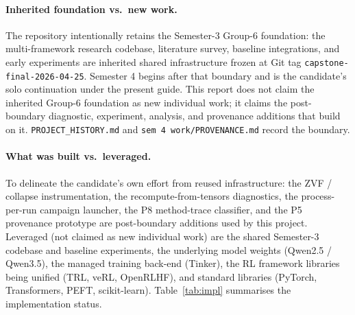 \documentclass[12pt,a4paper]{report}
\begin{document}
\paragraph{Inherited foundation vs.\ new work.} The repository intentionally retains
the Semester-3 Group-6 foundation: the multi-framework research codebase, literature
survey, baseline integrations, and early experiments are inherited shared
infrastructure frozen at Git tag \texttt{capstone-final-2026-04-25}. Semester 4 begins
after that boundary and is the candidate's solo continuation under the present guide.
This report does not claim the inherited Group-6 foundation as new individual work;
it claims the post-boundary diagnostic, experiment, analysis, and provenance additions
that build on it. \texttt{PROJECT\_HISTORY.md} and \texttt{sem 4 work/PROVENANCE.md}
record the boundary.

\paragraph{What was built vs.\ leveraged.} To delineate the candidate's own effort from
reused infrastructure: the ZVF / collapse instrumentation, the
recompute-from-tensors diagnostics, the process-per-run campaign launcher, the P8
method-trace classifier, and the P5 provenance prototype are post-boundary additions
used by this project. Leveraged (not claimed as new individual work) are the shared
Semester-3 codebase and baseline experiments, the underlying model weights
(Qwen2.5 / Qwen3.5), the managed training back-end (Tinker), the RL framework libraries
being unified (TRL, veRL, OpenRLHF), and standard libraries (PyTorch, Transformers,
PEFT, scikit-learn). Table~\ref{tab:impl} summarises the implementation status.
\end{document}
